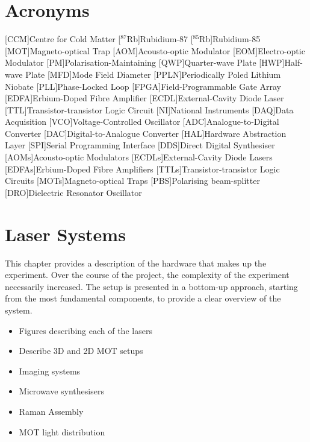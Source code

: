 \chapter*{Acronyms}
    \begin{acronym}
        [CCM]{Centre for Cold Matter}
        [\(^{87}\)Rb]{Rubidium-87}
        [\(^{85}\)Rb]{Rubidium-85}
        [MOT]{Magneto-optical Trap}
        [AOM]{Acousto-optic Modulator}
        [EOM]{Electro-optic Modulator}
        [PM]{Polarisation-Maintaining}
        [QWP]{Quarter-wave Plate}
        [HWP]{Half-wave Plate}
        [MFD]{Mode Field Diameter}
        [PPLN]{Periodically Poled Lithium Niobate}
        [PLL]{Phase-Locked Loop}
        [FPGA]{Field-Programmable Gate Array}
        [EDFA]{Erbium-Doped Fibre Amplifier}
        [ECDL]{External-Cavity Diode Laser}
        [TTL]{Transistor-transistor Logic Circuit}
        [NI]{National Instruments}
        [DAQ]{Data Acquisition}
        [VCO]{Voltage-Controlled Oscillator}
        [ADC]{Analogue-to-Digital Converter}
        [DAC]{Digital-to-Analogue Converter}
        [HAL]{Hardware Abstraction Layer}
        [SPI]{Serial Programming Interface}
        [DDS]{Direct Digital Synthesiser}
        [AOMs]{Acousto-optic Modulators}
        [ECDLs]{External-Cavity Diode Lasers}
        [EDFAs]{Erbium-Doped Fibre Amplifiers}
        [TTLs]{Transistor-transistor Logic Circuits}
        [MOTs]{Magneto-optical Traps}
        [PBS]{Polarising beam-splitter}
        [DRO]{Dielectric Resonator Oscillator}
    \end{acronym}


\chapter{Laser Systems}\label{chap:setup}
This chapter provides a description of the hardware that makes up the experiment. Over the course of the project, the complexity of the experiment necessarily increased. The setup is presented in a bottom-up approach, starting from the most fundamental components, to provide a clear overview of the system. \\

\begin{itemize}\item Figures describing each of the lasers
    \item Describe 3D and 2D MOT setups  
    \item Imaging systems
    \item Microwave synthesisers
    \item Raman Assembly
    \item MOT light distribution
\end{itemize}
